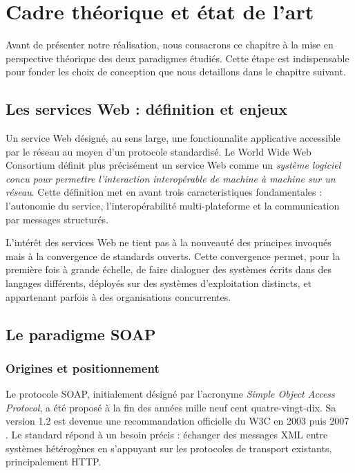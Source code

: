 \chapter{Cadre théorique et état de l'art}

Avant de présenter notre réalisation, nous consacrons ce chapitre à la mise en perspective théorique des deux paradigmes étudiés. Cette étape est indispensable pour fonder les choix de conception que nous detaillons dans le chapitre suivant.

\section{Les services Web : définition et enjeux}

Un service Web désigné, au sens large, une fonctionnalite applicative accessible par le réseau au moyen d'un protocole standardisé. Le World Wide Web Consortium définit plus précisément un service Web comme un \emph{système logiciel concu pour permettre l'interaction interopérable de machine à machine sur un réseau}. Cette définition met en avant trois caracteristiques fondamentales : l'autonomie du service, l'interopérabilité multi-plateforme et la communication par messages structurés.

L'intérêt des services Web ne tient pas à la nouveauté des principes invoqués mais à la convergence de standards ouverts. Cette convergence permet, pour la première fois à grande échelle, de faire dialoguer des systèmes écrits dans des langages différents, déployés sur des systèmes d'exploitation distincts, et appartenant parfois à des organisations concurrentes.

\section{Le paradigme SOAP}

\subsection{Origines et positionnement}

Le protocole SOAP, initialement désigné par l'acronyme \emph{Simple Object Access Protocol}, a été proposé à la fin des années mille neuf cent quatre-vingt-dix. Sa version 1.2 est devenue une recommandation officielle du W3C en 2003 puis 2007 \citep{w3csoap2007}. Le standard répond à un besoin précis : échanger des messages XML entre systèmes hétérogènes en s'appuyant sur les protocoles de transport existants, principalement HTTP.

